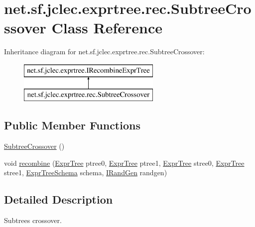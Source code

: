 \hypertarget{classnet_1_1sf_1_1jclec_1_1exprtree_1_1rec_1_1_subtree_crossover}{\section{net.\-sf.\-jclec.\-exprtree.\-rec.\-Subtree\-Crossover Class Reference}
\label{classnet_1_1sf_1_1jclec_1_1exprtree_1_1rec_1_1_subtree_crossover}
}
Inheritance diagram for net.\-sf.\-jclec.\-exprtree.\-rec.\-Subtree\-Crossover\-:\begin{figure}[H]
\begin{center}
\leavevmode
\includegraphics[height=2.000000cm]{classnet_1_1sf_1_1jclec_1_1exprtree_1_1rec_1_1_subtree_crossover}
\end{center}
\end{figure}
\subsection*{Public Member Functions}
\begin{DoxyCompactItemize}
\item 
\hyperlink{classnet_1_1sf_1_1jclec_1_1exprtree_1_1rec_1_1_subtree_crossover_a3736bf711bf1206566bd5ff1d0b42c16}{Subtree\-Crossover} ()
\item 
void \hyperlink{classnet_1_1sf_1_1jclec_1_1exprtree_1_1rec_1_1_subtree_crossover_a46d5b4f72068b6918846c5af385a6855}{recombine} (\hyperlink{classnet_1_1sf_1_1jclec_1_1exprtree_1_1_expr_tree}{Expr\-Tree} ptree0, \hyperlink{classnet_1_1sf_1_1jclec_1_1exprtree_1_1_expr_tree}{Expr\-Tree} ptree1, \hyperlink{classnet_1_1sf_1_1jclec_1_1exprtree_1_1_expr_tree}{Expr\-Tree} stree0, \hyperlink{classnet_1_1sf_1_1jclec_1_1exprtree_1_1_expr_tree}{Expr\-Tree} stree1, \hyperlink{classnet_1_1sf_1_1jclec_1_1exprtree_1_1_expr_tree_schema}{Expr\-Tree\-Schema} schema, \hyperlink{interfacenet_1_1sf_1_1jclec_1_1util_1_1random_1_1_i_rand_gen}{I\-Rand\-Gen} randgen)
\end{DoxyCompactItemize}


\subsection{Detailed Description}
Subtrees crossover.

